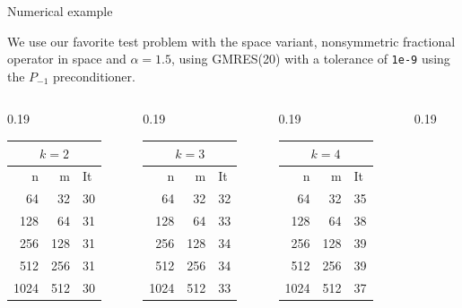 \documentclass[aspectratio=169,xcolor=dvipsnames]{beamer}
\begin{document}
\begin{frame}{Numerical example}

We use our favorite test problem with the space variant, nonsymmetric fractional operator in space and $\alpha=1.5$, using GMRES(20) with a tolerance of \texttt{1e-9} using the $P_{-1}$ preconditioner.

\begin{columns}
\begin{column}{0.19\columnwidth}
\begin{tabular}{rrl}
\toprule
\multicolumn{3}{c}{$k=2$} \\
\midrule 
n & m & It \\
\midrule 
64 & 32 & 30 \\
128 & 64 & 31 \\
256 & 128 & 31 \\
512 & 256 & 31 \\
1024 & 512 & 30 \\
\bottomrule
\end{tabular}
\end{column}
\begin{column}{0.19\columnwidth}
\begin{tabular}{rrl}
	\toprule
	\multicolumn{3}{c}{$k=3$} \\
	\midrule 
	n & m & It \\
	\midrule 	
64 & 32 & 32 \\
128 & 64 & 33 \\
256 & 128 & 34 \\
512 & 256 & 34 \\
1024 & 512 & 33 \\
\bottomrule
\end{tabular}
\end{column}
\begin{column}{0.19\columnwidth}
\begin{tabular}{rrl}
	\toprule
	\multicolumn{3}{c}{$k=4$} \\
	\midrule 
	n & m & It \\
	\midrule 	
64 & 32 & 35 \\
128 & 64 & 38 \\
256 & 128 & 39 \\
512 & 256 & 39  \\
1024 & 512 & 37 \\
\bottomrule
\end{tabular}
\end{column}
\begin{column}{0.19\columnwidth}
\begin{tabular}{rrl}

\end{tabular}
\end{column}
\end{columns}
\end{frame}
\end{document}
